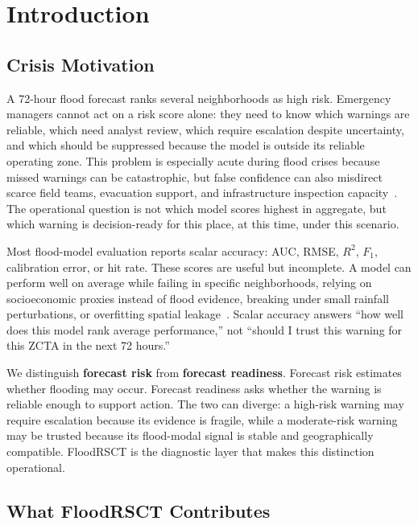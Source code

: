\documentclass[sigconf,nonacm=true,review,authoryear]{acmart}
\begin{document}
\section{Introduction}
\label{sec:intro}

\subsection{Crisis Motivation}
\label{sec:intro-motivation}

A 72-hour flood forecast ranks several neighborhoods as high risk. Emergency managers cannot act on a risk score alone: they need to know which warnings are reliable, which need analyst review, which require escalation despite uncertainty, and which should be suppressed because the model is outside its reliable operating zone. This problem is especially acute during flood crises because missed warnings can be catastrophic, but false confidence can also misdirect scarce field teams, evacuation support, and infrastructure inspection capacity~\citep{morss2008}. The operational question is not which model scores highest in aggregate, but which warning is decision-ready for this place, at this time, under this scenario.

Most flood-model evaluation reports scalar accuracy: AUC, RMSE, $R^2$, $F_1$, calibration error, or hit rate. These scores are useful but incomplete. A model can perform well on average while failing in specific neighborhoods, relying on socioeconomic proxies instead of flood evidence, breaking under small rainfall perturbations, or overfitting spatial leakage~\citep{roberts2017cv,ploton2020spatial}. Scalar accuracy answers ``how well does this model rank average performance,'' not ``should I trust this warning for this ZCTA in the next 72 hours.''

We distinguish \textbf{forecast risk} from \textbf{forecast readiness}. Forecast risk estimates whether flooding may occur. Forecast readiness asks whether the warning is reliable enough to support action. The two can diverge: a high-risk warning may require escalation because its evidence is fragile, while a moderate-risk warning may be trusted because its flood-modal signal is stable and geographically compatible. FloodRSCT is the diagnostic layer that makes this distinction operational.

\subsection{What FloodRSCT Contributes}
\label{sec:intro-contributes}
\end{document}
